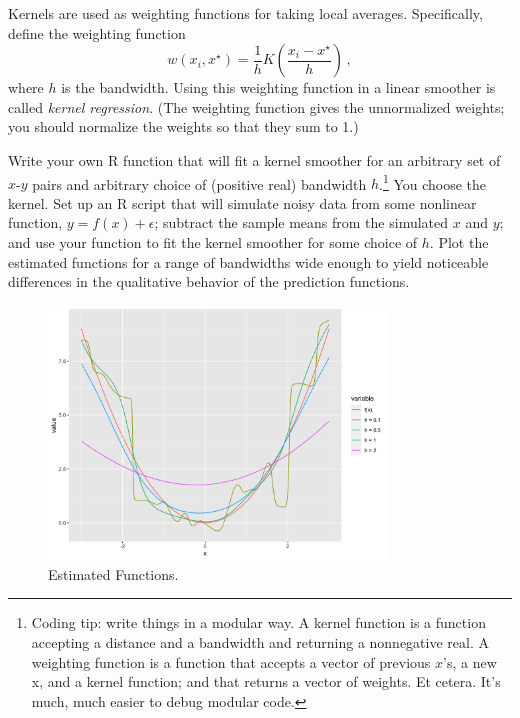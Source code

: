 \documentclass[11pt]{article}
\begin{document}
\begin{enumerate}[(A)]
Kernels are used as weighting functions for taking local averages.  Specifically, define the weighting function
$$
w(x_i, x^{\star}) = \frac{1}{h} K \left( \frac{x_i - x^{\star}}{h} \right)  \, ,
$$
where $h$ is the bandwidth.    Using this weighting function in a linear smoother is called \textit{kernel regression}.  (The weighting function gives the unnormalized weights; you should normalize the weights so that they sum to 1.)

Write your own R function that will fit a kernel smoother for an arbitrary set of $x$-$y$ pairs and arbitrary choice of (positive real) bandwidth $h$.\footnote{Coding tip: write things in a modular way.  A kernel function is a function accepting a distance and a bandwidth and returning a nonnegative real.  A weighting function is a function that accepts a vector of previous $x$'s, a new x, and a kernel function; and that returns a vector of weights.  Et cetera.  It's much, much easier to debug modular code.}  You choose the kernel.  Set up an R script that will simulate noisy data from some nonlinear function, $y = f(x) + \epsilon$; subtract the sample means from the simulated $x$ and $y$; and use your function to fit the kernel smoother for some choice of $h$. Plot the estimated functions for a range of bandwidths wide enough to yield noticeable differences in the qualitative behavior of the prediction functions.

\begin{figure}[h]
    \centering
    \includegraphics[width=0.8\textwidth]{Ex6/figures/kernel.png}
    \caption{Estimated Functions.}
\end{figure}

\end{enumerate}

\newpage
\end{document}
